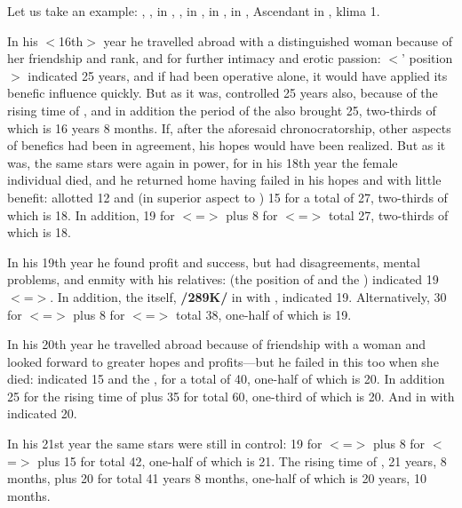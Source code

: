 Let us take an example: \Sun, \Saturn, \Mercury\xspace in \Aries, \Moon, \Jupiter\xspace in \Leo, \Mars\xspace in \Taurus, \Venus\xspace in \Aquarius, Ascendant in \Virgo, klima 1. 

In his $<$16th$>$ year he travelled abroad with a distinguished
woman because of her friendship and rank, and for further intimacy and erotic passion: \Aquarius\xspace $<$\Venus’ position$>$ indicated 25 years, and if \Venus\xspace had been operative alone, it would have applied its benefic influence quickly. But as it was, \Mars\xspace controlled 25 years also, because of the rising time of \Taurus, and in addition the period of the \Moon\xspace also brought 25, two-thirds of which is 16 years 8 months. If, after the aforesaid chronocratorship, other aspects of benefics had been in agreement, his hopes would have been realized. But as it was, the same stars were again in power, for in his 18th year the female individual died,
and he returned home having failed in his hopes and with little benefit: \Jupiter\xspace allotted 12 and \Mars\xspace (in superior aspect to \Jupiter) 15 for a total of 27, two-thirds of which is 18. In addition, 19 for \Leo\xspace $<$=\Sun$>$ plus 8 for \Taurus\xspace $<$=\Venus$>$ total 27, two-thirds of which is 18.

In his 19th year he found profit and success, but had disagreements, mental problems, and enmity with his relatives: \Leo\xspace (the position of \Jupiter\xspace and the \Moon) indicated 19 $<$=\Sun$>$. In addition, the \Sun\xspace itself, \textbf{/289K/} in \Aries\xspace with \Saturn, indicated 19. Alternatively, 30 for \Aquarius\xspace $<$=\Saturn$>$ plus 8 for \Taurus\xspace
$<$=\Venus$>$ total 38, one-half of which is 19. 

In his 20th year he travelled abroad because of friendship with
a woman and looked forward to greater hopes and profits—but he failed in this too when she died: \Mars \xspace indicated 15 and the \Moon\xspace 25, for a total of 40, one-half of which is 20. In addition 25 for the rising time of \Taurus\xspace plus 35 for \Leo\xspace total 60, one-third of which is 20. And \Mercury\xspace in \Aries\xspace with \Saturn\xspace indicated 20. 

In his 21st year the same stars were still in control: 19 for \Leo\xspace $<$=\Sun$>$ plus 8 for \Taurus\xspace $<$=\Venus$>$ plus 15 for \Mars\xspace total 42, one-half of which is 21. The rising time of \Aries, 21 years, 8 months, plus 20 for \Mercury\xspace total 41 years 8 months, one-half of which is 20 years, 10 months. 

